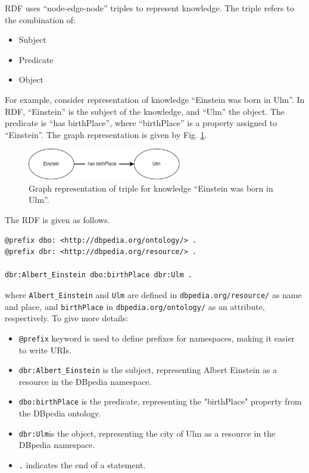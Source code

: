 RDF uses ``node-edge-node'' triples to represent knowledge. The triple refers to the combination of:
\begin{itemize}
  \item Subject
  \item Predicate
  \item Object
\end{itemize}
For example, consider representation of knowledge ``Einstein was born in Ulm''. In RDF, ``Einstein'' is the subject of the knowledge, and ``Ulm'' the object. The predicate is ``has birthPlace'', where ``birthPlace'' is a property assigned to ``Einstein''. The graph representation is given by Fig. \ref{fig:einsteinexp}.
\begin{figure}[htbp]
	\centering
	\includegraphics[width=0.6\textwidth]{./chapters/ch-semanticwebarchitecture/figures/einsteinexp.png}
	\caption{Graph representation of triple for knowledge ``Einstein was born in Ulm''.}
	\label{fig:einsteinexp}
\end{figure}
The RDF is given as follows.
\begin{lstlisting}
@prefix dbo: <http://dbpedia.org/ontology/> .
@prefix dbr: <http://dbpedia.org/resource/> .

dbr:Albert_Einstein dbo:birthPlace dbr:Ulm .
\end{lstlisting}
where \verb|Albert_Einstein| and \verb|Ulm| are defined in \verb|dbpedia.org/resource/| as name and place, and \verb|birthPlace| in \verb|dbpedia.org/ontology/| as an attribute, respectively. To give more details:
\begin{itemize}
  \item \verb|@prefix| keyword is used to define prefixes for namespaces, making it easier to write URIs.
  \item \verb|dbr:Albert_Einstein| is the subject, representing Albert Einstein as a resource in the DBpedia namespace.
  \item \verb|dbo:birthPlace| is the predicate, representing the "birthPlace" property from the DBpedia ontology.
  \item \verb|dbr:Ulm|is the object, representing the city of Ulm as a resource in the DBpedia namespace.
  \item \verb|.| indicates the end of a statement.
\end{itemize}

